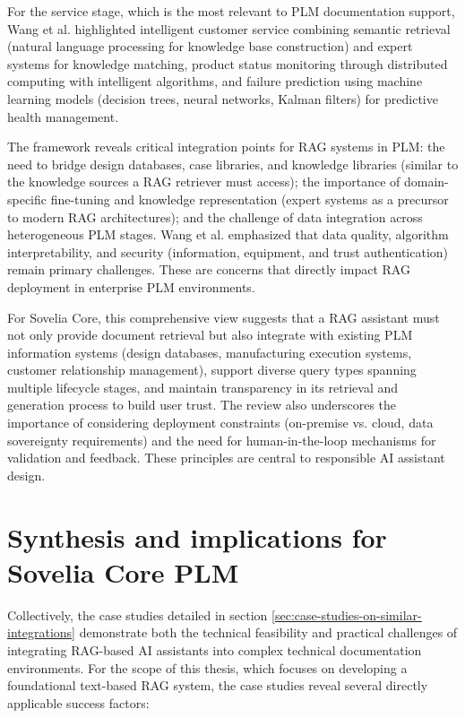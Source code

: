For the service stage, which is the most relevant to PLM documentation support, Wang et al. highlighted intelligent customer service combining semantic retrieval (natural language processing for knowledge base construction) and expert systems for knowledge matching, product status monitoring through distributed computing with intelligent algorithms, and failure prediction using machine learning models (decision trees, neural networks, Kalman filters) for predictive health management.

The framework reveals critical integration points for RAG systems in PLM: the need to bridge design databases, case libraries, and knowledge libraries (similar to the knowledge sources a RAG retriever must access); the importance of domain-specific fine-tuning and knowledge representation (expert systems as a precursor to modern RAG architectures); and the challenge of data integration across heterogeneous PLM stages. Wang et al. emphasized that data quality, algorithm interpretability, and security (information, equipment, and trust authentication) remain primary challenges. These are concerns that directly impact RAG deployment in enterprise PLM environments.

For Sovelia Core, this comprehensive view suggests that a RAG assistant must not only provide document retrieval but also integrate with existing PLM information systems (design databases, manufacturing execution systems, customer relationship management), support diverse query types spanning multiple lifecycle stages, and maintain transparency in its retrieval and generation process to build user trust. The review also underscores the importance of considering deployment constraints (on-premise vs. cloud, data sovereignty requirements) and the need for human-in-the-loop mechanisms for validation and feedback. These principles are central to responsible AI assistant design.

\section{Synthesis and implications for Sovelia Core PLM}

Collectively, the case studies detailed in section \ref{sec:case-studies-on-similar-integrations} demonstrate both the technical feasibility and practical challenges of integrating RAG-based AI assistants into complex technical documentation environments. For the scope of this thesis, which focuses on developing a foundational text-based RAG system, the case studies reveal several directly applicable success factors:

